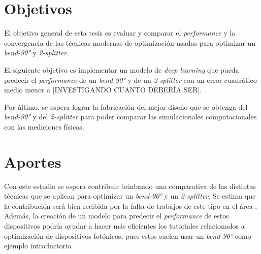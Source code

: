 \section{Objetivos}

El objetivo general de esta tesis es evaluar y comparar el \emph{performance} y la convergencia de las técnicas modernas de optimización usadas para optimizar un \emph{bend-90°} y \emph{2-splitter}.

El siguiente objetivo es implementar un modelo de \emph{deep learning} que pueda predecir el \emph{performance} de un \emph{bend-90°} y de un \emph{2-splitter} con un error cuadrático medio menor a [INVESTIGANDO CUANTO DEBERÍA SER]. 

Por último, se espera lograr la fabricación del mejor diseño que se obtenga del \emph{bend-90°} y del \emph{2-splitter} para poder comparar las simulacionales computacionales con las mediciones físicas.

\section{Aportes}

Con este estudio se espera contribuir brinbando una comparativa de las distintas técnicas que se aplican para optimizar un \emph{bend-90°} y un \emph{2-splitter}. 
Se estima que la contribución será bien recibida por la falta de trabajos de este tipo en el área \cite{Schneider2019, Elsawy2020}.
Además, la creación de un modelo para predecir el \emph{performance} de estos dispositivos podría ayudar a hacer más eficientes los tutoriales
relacionados a optimización de dispositivos fotónicos, pues estos suelen usar un \emph{bend-90°} como ejemplo introductorio.

